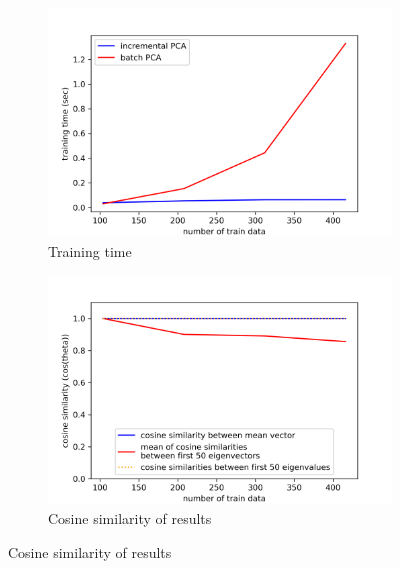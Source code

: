 \begin{figure}[t]
	\centering
	\begin{subfigure}[t]{0.48\linewidth}
		\centering
		\includegraphics[width=\linewidth]{image/q2-fig1.png}
		\caption{Training time}
		\label{fig:q2-fig1}
	\end{subfigure}%
	\hfill
	\begin{subfigure}[t]{0.48\linewidth}
		\centering
		\includegraphics[width=\linewidth]{image/q2-fig2.png}
		\caption{Cosine similarity of results}
		\label{fig:q2-fig2}
	\end{subfigure}
	

\end{figure}
